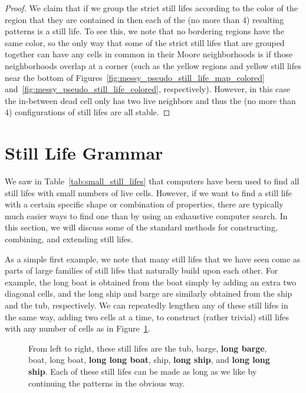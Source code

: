 \begin{proof}
	We claim that if we group the strict still lifes according to the color of the region that they are contained in then each of the (no more than $4$) resulting patterns is a still life. To see this, we note that no bordering regions have the same color, so the only way that some of the strict still lifes that are grouped together can have any cells in common in their Moore neighborhoods is if those neighborhoods overlap at a corner (such as the yellow regions and yellow still lifes near the bottom of Figures~\ref{fig:messy_pseudo_still_life_map_colored} and~\ref{fig:messy_pseudo_still_life_colored}, respectively). However, in this case the in-between dead cell only has two live neighbors and thus the (no more than $4$) configurations of still lifes are all stable.
\end{proof}


\section{Still Life Grammar}\label{sec:still_life_grammar}

We saw in Table~\ref{tab:small_still_lifes} that computers have been used to find all still lifes with small numbers of live cells. However, if we want to find a still life with a certain specific shape or combination of properties, there are typically much easier ways to find one than by using an exhaustive computer search. In this section, we will discuss some of the standard methods for constructing, combining, and extending still lifes.

As a simple first example, we note that many still lifes that we have seen come as parts of large families of still lifes that naturally build upon each other. For example, the long boat is obtained from the boat simply by adding an extra two diagonal cells, and the long ship and barge are similarly obtained from the ship and the tub, respectively. We can repeatedly lengthen any of these still lifes in the same way, adding two cells at a time, to construct (rather trivial) still lifes with any number of cells as in Figure~\ref{fig:tub_boat_ship}.

\begin{figure}[!htb]
	\centering{}
	\caption{From left to right, these still lifes are the tub, barge, \textbf{long barge}, boat, long boat, \textbf{long long boat}, ship, \textbf{long ship}, and \textbf{long long ship}. Each of these still lifes can be made as long as we like by continuing the patterns in the obvious way.}\label{fig:tub_boat_ship}
\end{figure}


